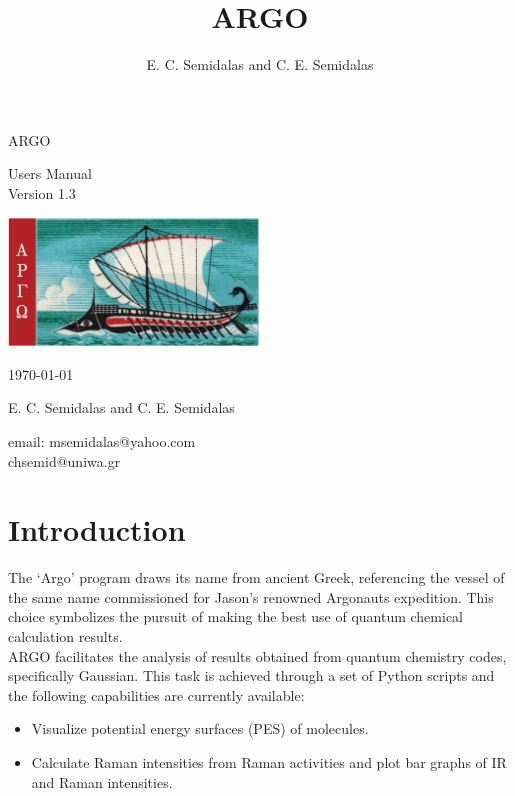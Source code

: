 \documentclass[12pt]{article}
\title{ARGO}
\author{E. C. Semidalas and C. E. Semidalas}
\date{} %
\begin{document}
\begin{titlepage}
    \centering
    {\Huge ARGO} \par
    \vspace{1cm} %
    \vspace{1cm} %
    {\Large Users Manual\\Version 1.3} \par
    \vspace{1cm} %
    \includegraphics[width=0.50\textwidth]{argo_triiris.png} \par
    \label{fig1}
    \vspace{1cm} %
    {\large \today} \par %
    \vspace{1cm}    
    {E. C. Semidalas and C. E. Semidalas} \par
    email: msemidalas@yahoo.com \\ chsemid@uniwa.gr
    
\end{titlepage}

\newpage

\section{Introduction}
\justifying
The `Argo' program draws its name from ancient Greek, referencing the vessel of the same name commissioned for Jason's renowned Argonauts expedition. This choice symbolizes the pursuit of making the best use of quantum chemical calculation results.\\
ARGO facilitates the analysis of results obtained from quantum chemistry codes, specifically Gaussian.\cite{Frisch2016a} This task is achieved through a set of Python scripts and the following capabilities are currently available:

\begin{itemize}
    \item Visualize potential energy surfaces (PES) of molecules.

    \item Calculate Raman intensities from Raman activities and plot bar graphs of IR and Raman intensities.    
\end{itemize}
\end{document}
